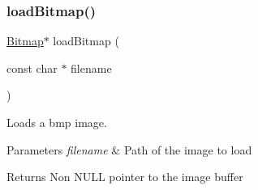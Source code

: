 \subsubsection{\texorpdfstring{load\+Bitmap()}{loadBitmap()}}
{\footnotesize\ttfamily \hyperlink{struct_bitmap}{Bitmap}$\ast$ load\+Bitmap (\begin{DoxyParamCaption}\item[{const char $\ast$}]{filename }\end{DoxyParamCaption})}



Loads a bmp image. 


\begin{DoxyParams}{Parameters}
{\em filename} & Path of the image to load \\
\hline
\end{DoxyParams}
\begin{DoxyReturn}{Returns}
Non N\+U\+LL pointer to the image buffer 
\end{DoxyReturn}
